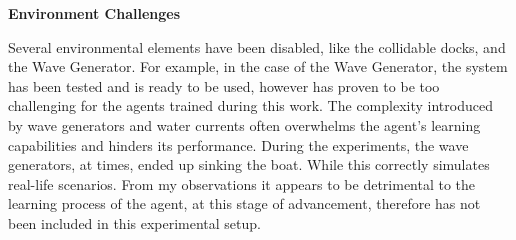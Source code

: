 \begin{textblock}
{\bf Environment Challenges }

Several environmental elements have been disabled, like the collidable docks, and the Wave Generator. For example, in the case of the Wave Generator, the system has been tested and is ready to be used, however has proven to be too challenging for the agents trained during this work. The complexity introduced by wave generators and water currents often overwhelms the agent's learning capabilities and hinders its performance.
During the experiments, the wave generators, at times, ended up sinking the boat. While this correctly simulates real-life scenarios. From my observations it appears to be detrimental to the learning process of the agent, at this stage of advancement, therefore has not been included in this experimental setup.

\end{textblock}